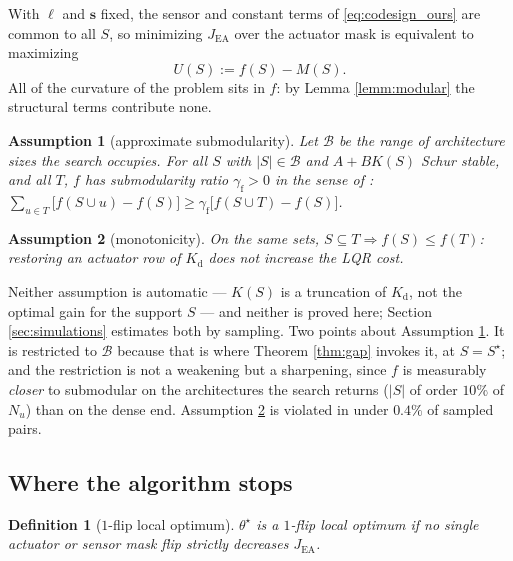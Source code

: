 \documentclass[letterpaper, 10pt, conference]{ieeeconf}
\newtheorem{assumption}{Assumption}
\newtheorem{definition}{Definition}
\begin{document}
With $\ell$ and $\mathbf{s}$ fixed, the sensor and constant terms of
\eqref{eq:codesign_ours} are common to all $S$, so minimizing $J_\mathrm{EA}$ over
the actuator mask is equivalent to maximizing
\begin{equation}\label{eq:US}
  U(S) := f(S) - M(S).
\end{equation}
All of the curvature of the problem sits in $f$: by Lemma \ref{lemm:modular} the
structural terms contribute none.

\begin{assumption}[approximate submodularity]\label{as:submod}
Let $\mathcal{B}$ be the range of architecture sizes the search occupies. For all
$S$ with $|S|\in\mathcal{B}$ and $A+BK(S)$ Schur stable, and all $T$, $f$ has
submodularity ratio $\gamma_{\mathrm{f}} > 0$ in the sense of \cite{daskempe}:
$\sum_{u\in T}\bigl[f(S\cup u)-f(S)\bigr] \geq \gamma_{\mathrm{f}}\bigl[f(S\cup T)-f(S)\bigr]$.
\end{assumption}

\begin{assumption}[monotonicity]\label{as:mono}
On the same sets, $S\subseteq T \Rightarrow f(S)\leq f(T)$: restoring an actuator
row of $K_\mathrm{d}$ does not increase the LQR cost.
\end{assumption}

Neither assumption is automatic --- $K(S)$ is a truncation of $K_\mathrm{d}$, not
the optimal gain for the support $S$ --- and neither is proved here; Section
\ref{sec:simulations} estimates both by sampling. Two points about
Assumption \ref{as:submod}. It is restricted to $\mathcal{B}$ because that is
where Theorem \ref{thm:gap} invokes it, at $S = S^\star$; and the restriction is
not a weakening but a sharpening, since $f$ is measurably \emph{closer} to
submodular on the architectures the search returns ($|S|$ of order $10\%$ of
$N_u$) than on the dense end. Assumption \ref{as:mono} is violated in under
$0.4\%$ of sampled pairs.

\subsection{Where the algorithm stops}

\begin{definition}[$1$-flip local optimum]\label{def:loc-opt}
$\theta^\star$ is a \emph{$1$-flip local optimum} if no single actuator or sensor
mask flip strictly decreases $J_\mathrm{EA}$.
\end{definition}
\end{document}
